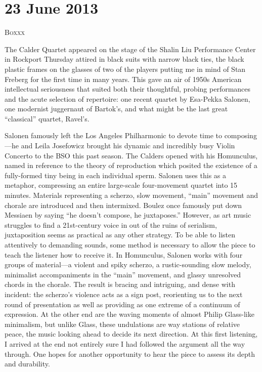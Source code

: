 \chapter{23 June 2013}

\textsc{Boxxx}

The Calder Quartet appeared on the stage of the Shalin Liu Performance Center in Rockport Thursday attired in black suits with narrow black ties, the black plastic frames on the glasses of two of the players putting me in mind of Stan Freberg for the first time in many years. This gave an air of 1950s American intellectual seriousness that suited both their thoughtful, probing performances and the acute selection of repertoire: one recent quartet by Esa-Pekka Salonen, one modernist juggernaut of Bartok’s, and what might be the last great “classical” quartet, Ravel’s.

Salonen famously left the Los Angeles Philharmonic to devote time to composing—he and Leila Josefowicz brought his dynamic and incredibly busy Violin Concerto to the BSO this past season. The Calders opened with his Homunculus, named in reference to the theory of reproduction which posited the existence of a fully-formed tiny being in each individual sperm. Salonen uses this as a metaphor, compressing an entire large-scale four-movement quartet into 15 minutes. Materials representing a scherzo, slow movement, “main” movement and chorale are introduced and then intermixed. Boulez once famously put down Messiaen by saying “he doesn’t compose, he juxtaposes.” However, as art music struggles to find a 21st-century voice in out of the ruins of serialism, juxtaposition seems as practical as any other strategy. To be able to listen attentively to demanding sounds, some method is necessary to allow the piece to teach the listener how to receive it. In Homunculus, Salonen works with four groups of material—a violent and spiky scherzo, a rustic-sounding slow melody, minimalist accompaniments in the “main” movement, and glassy unresolved chords in the chorale. The result is bracing and intriguing, and dense with incident: the scherzo’s violence acts as a sign post, reorienting us to the next round of presentation as well as providing as one extreme of a continuum of expression. At the other end are the waving moments of almost Philip Glass-like minimalism, but unlike Glass, these undulations are way stations of relative peace, the music looking ahead to decide its next direction. At this first listening, I arrived at the end not entirely sure I had followed the argument all the way through. One hopes for another opportunity to hear the piece to assess its depth and durability.


